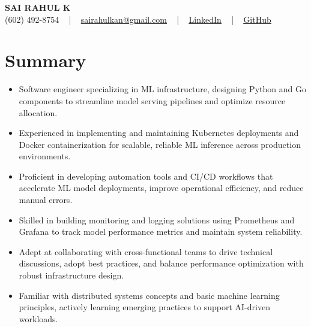 \documentclass[letterpaper,11pt]{article}
\newcommand{\resumeItem}[1]{
  \item\footnotesize{
    {#1 \vspace{-2pt}}
  }
}
\newcommand{\resumeItemListStart}{\begin{itemize}[leftmargin=*]}
\newcommand{\resumeItemListEnd}{\end{itemize}\vspace{-5pt}}
\begin{document}
\begin{center}
    {\fontsize{14pt}{12pt}\selectfont \textbf{\MakeUppercase{Sai Rahul K}}}\\ \vspace{2pt}
    \fontsize{10pt}{12pt}\selectfont (602) 492-8754 ~ | ~ \href{mailto:sairahulkan@gmail.com}{sairahulkan@gmail.com} ~ | ~
    \href{https://www.linkedin.com/in/rq123/}{\color{blue}\underline{LinkedIn}} ~ | ~
    \href{https://github.com/kanrahuldo}{\color{blue}\underline{GitHub}}~
    \vspace{-8pt}
\end{center}

\section{Summary}
\fontsize{9pt}{10pt}\selectfont
\resumeItemListStart
    \resumeItem{Software engineer specializing in ML infrastructure, designing Python and Go components to streamline model serving pipelines and optimize resource allocation.}
    \resumeItem{Experienced in implementing and maintaining Kubernetes deployments and Docker containerization for scalable, reliable ML inference across production environments.}
    \resumeItem{Proficient in developing automation tools and CI/CD workflows that accelerate ML model deployments, improve operational efficiency, and reduce manual errors.}
    \resumeItem{Skilled in building monitoring and logging solutions using Prometheus and Grafana to track model performance metrics and maintain system reliability.}
    \resumeItem{Adept at collaborating with cross-functional teams to drive technical discussions, adopt best practices, and balance performance optimization with robust infrastructure design.}
    \resumeItem{Familiar with distributed systems concepts and basic machine learning principles, actively learning emerging practices to support AI-driven workloads.}
\resumeItemListEnd
\vspace{-6pt}
\end{document}
